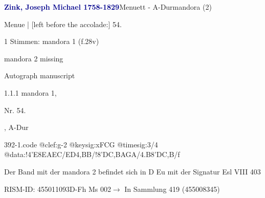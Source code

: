 \documentclass[twocolumn, 12pt]{book}
\begin{document}
\par \vspace{16pt} \textcolor{darkblue}{\textbf{Zink, Joseph Michael  1758-1829}}\hfillplus{\textbf{[392]}}\newline Menuett - A-Dur\newline mandora (2)
\par \begin{itshape}[f.28v, at left:] Menue | [left before the accolade:] 54.\end{itshape} 
\par \textcolor{darkblue}{}  1 Stimmen: mandora 1  (f.28v)\newline \begin{small} mandora 2 missing\end{small} \newline Autograph manuscript
\par 1.1.1  mandora 1, \begin{itshape}Nr. 54.\end{itshape}, A-Dur  
\begin{filecontents*}{392-1.code}
@clef:g-2
@keysig:xFCG
@timesig:3/4
@data:!4'E{8EAEC}/{ED}4,BB/!{8'DC}{,BA}{GA}/4.B8'D{C,B}/f
\end{filecontents*}
\newline %
\par Der Band mit der mandora 2 befindet sich in D Eu mit der Signatur Esl VIII 403
\par RISM-ID: 455011093\newline D-Fh  Ms 002\newline $\rightarrow$ In Sammlung 419 (455008345)
      
\end{document}
